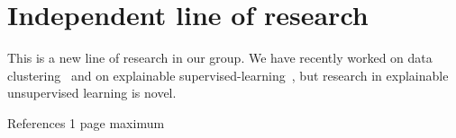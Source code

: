 \documentclass[a4paper,11pt]{article}
\begin{document}
\section{Independent line of research}


This is a new line of research in our group. 
We have recently worked on data clustering~\cite{spoerhase2023constant,thejaswi2021diversity}
and on explainable supervised-learning~\cite{ciaperoni2023concise,zhang2020diverse,zhang2023regularized}, 
but research in explainable unsupervised learning is novel.


{\small
\setlength{\bibsep}{0pt}


}

{\color{orange}References 1 page maximum} 

% 
\end{document}
